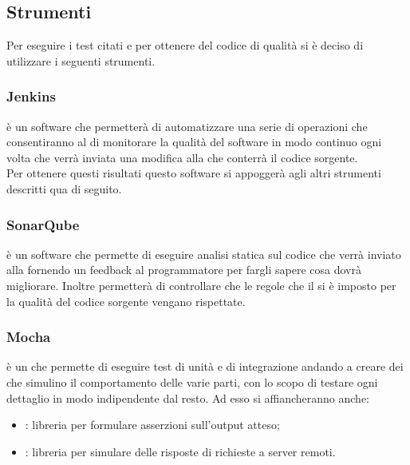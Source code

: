 \subsection{Strumenti}
Per eseguire i test citati e per ottenere del codice di qualità si è deciso di utilizzare i seguenti strumenti.

\subsubsection{Jenkins}
 è un software che permetterà di automatizzare una serie di operazioni che consentiranno al  di monitorare la qualità del software in modo continuo ogni volta che verrà inviata una modifica alla  che conterrà il codice sorgente. \\
Per ottenere questi risultati questo software si appoggerà agli altri strumenti descritti qua di seguito.

\subsubsection{SonarQube}
 è un software che permette di eseguire analisi statica sul codice che verrà inviato alla  fornendo un feedback al programmatore per fargli sapere cosa dovrà migliorare. Inoltre permetterà di controllare che le regole che il  si è imposto per la qualità del codice sorgente vengano rispettate.

\subsubsection{Mocha}
 è un  che permette di eseguire test di unità e di integrazione andando a creare dei  che simulino il comportamento delle varie parti, con lo scopo di testare ogni dettaglio in modo indipendente dal resto. Ad esso si affiancheranno anche:
\begin{itemize}
\item \textbf{}: libreria per formulare asserzioni sull'output atteso;
\item \textbf{}: libreria per simulare delle risposte di richieste a server remoti.
\end{itemize}
\newpage